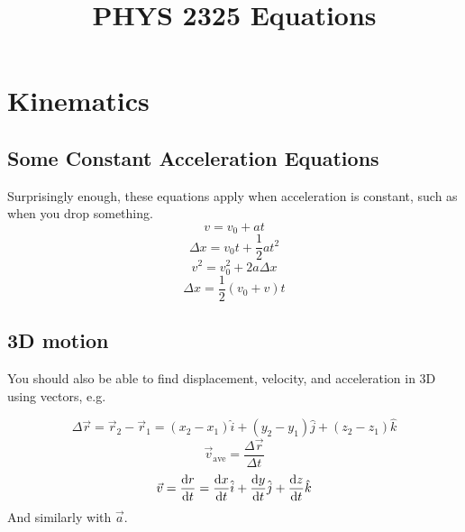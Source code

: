 \documentclass{article}
\title{PHYS 2325 Equations}
\author{}
\date{}
\numberwithin{equation}{section}
\begin{document}
    \maketitle
    \tableofcontents

    \newpage
    \section{Kinematics}
        \subsection*{Some Constant Acceleration Equations}
            Surprisingly enough, these equations apply when acceleration is constant, such as when you drop something.
            \begin{equation}
                v = v_0 + at
            \end{equation}
            \begin{equation}
                \Delta x = v_0t + \frac{1}{2}at^2
            \end{equation}
            \begin{equation}
                v^2 = v_0^2 + 2a\Delta x
            \end{equation}
            \begin{equation}
                \Delta x = \frac{1}{2}(v_0 + v)t
            \end{equation}

        \subsection*{3D motion}
            You should also be able to find displacement, velocity, and acceleration in 3D using vectors, e.g.

            \begin{equation}
                \Delta \vec{r} = \vec{r}_2 - \vec{r}_1 =
                (x_2 - x_1)\hat{i} + (y_2 - y_1)\hat{j} + (z_2 - z_1)\hat{k}
            \end{equation}
            \begin{equation}
                \vec{v}_{\mathrm{ave}} = \frac{\Delta\vec{r}}{\Delta t}
            \end{equation}
            \begin{equation}
                \vec{v} = \dv{r}{t} =
                \dv{x}{t}\hat{i} + \dv{y}{t}\hat{j} + \dv{z}{t}\hat{k}
            \end{equation}
            And similarly with $\vec{a}$.
\end{document}

